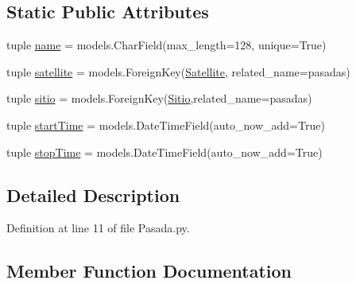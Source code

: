 \subsection*{Static Public Attributes}
\begin{DoxyCompactItemize}
\item 
tuple \hyperlink{class_ground_segment_1_1models_1_1_pasada_1_1_pasada_a1784ce0d3443756f0a2d846e82f5c79b}{name} = models.\+Char\+Field(max\+\_\+length=128, unique=True)
\item 
tuple \hyperlink{class_ground_segment_1_1models_1_1_pasada_1_1_pasada_aff2cf52f9825341a81fb40b46ad003ea}{satellite} = models.\+Foreign\+Key(\hyperlink{class_ground_segment_1_1models_1_1_satellite_1_1_satellite}{Satellite}, related\+\_\+name=\textquotesingle{}pasadas\textquotesingle{})
\item 
tuple \hyperlink{class_ground_segment_1_1models_1_1_pasada_1_1_pasada_a11b3cdc3860dfd371e447d34fe002767}{sitio} = models.\+Foreign\+Key(\hyperlink{class_ground_segment_1_1models_1_1_sitio_1_1_sitio}{Sitio},related\+\_\+name=\textquotesingle{}pasadas\textquotesingle{})
\item 
tuple \hyperlink{class_ground_segment_1_1models_1_1_pasada_1_1_pasada_abceb32f3eb016d4e6d2bee806204242b}{start\+Time} = models.\+Date\+Time\+Field(auto\+\_\+now\+\_\+add=True)
\item 
tuple \hyperlink{class_ground_segment_1_1models_1_1_pasada_1_1_pasada_aa26eb2642841aeccd68e417cd3eb4dba}{stop\+Time} = models.\+Date\+Time\+Field(auto\+\_\+now\+\_\+add=True)
\end{DoxyCompactItemize}


\subsection{Detailed Description}


Definition at line 11 of file Pasada.\+py.



\subsection{Member Function Documentation}
\hypertarget{class_ground_segment_1_1models_1_1_pasada_1_1_pasada_a5c21dff9dda2ed2fa07752dfb0c1938b}{}
